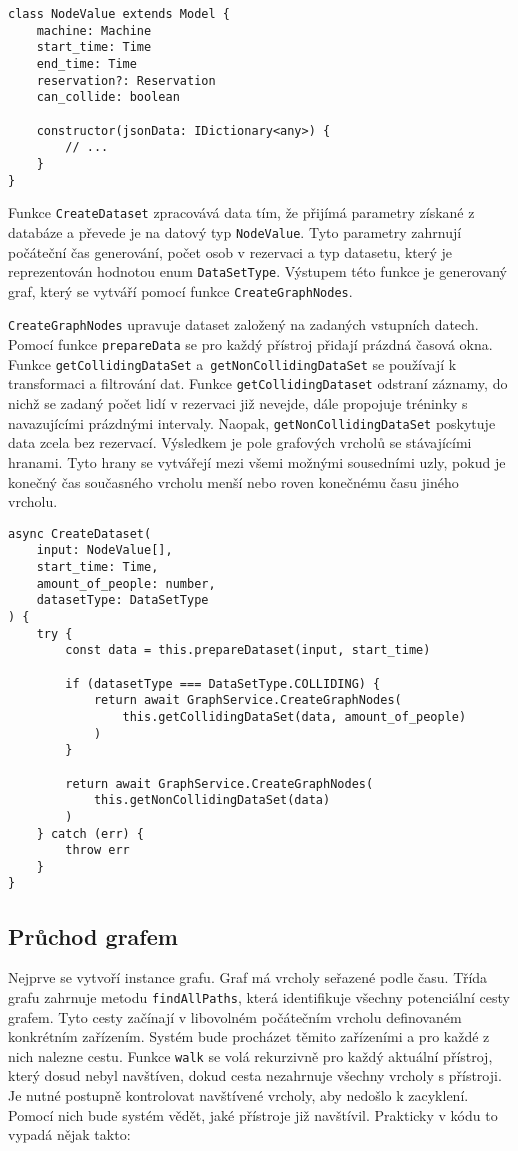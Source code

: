 \begin{lstlisting}
class NodeValue extends Model {
    machine: Machine
    start_time: Time
    end_time: Time
    reservation?: Reservation
    can_collide: boolean

    constructor(jsonData: IDictionary<any>) {
	    // ...
    }
}
\end{lstlisting}

Funkce \texttt{CreateDataset} zpracovává data tím, že přijímá parametry získané z databáze a převede je na datový typ \texttt{NodeValue}. Tyto parametry zahrnují počáteční čas generování, počet osob v rezervaci a typ datasetu, který je reprezentován hodnotou enum \texttt{DataSetType}. Výstupem této funkce je generovaný graf, který se vytváří pomocí funkce \texttt{CreateGraphNodes}.

\texttt{CreateGraphNodes} upravuje dataset založený na zadaných vstupních datech. Pomocí funkce \texttt{prepareData} se pro každý přístroj přidají prázdná časová okna. Funkce \texttt{getCollidingDataSet} a~\texttt{getNonCollidingDataSet} se používají k transformaci a filtrování dat. Funkce \texttt{getCollidingDataset} odstraní záznamy, do nichž se zadaný počet lidí v rezervaci již nevejde, dále propojuje tréninky s navazujícími prázdnými intervaly. Naopak, \texttt{getNonCollidingDataSet} poskytuje data zcela bez rezervací. Výsledkem je pole grafových vrcholů se stávajícími hranami. Tyto hrany se vytvářejí mezi všemi možnými sousedními uzly, pokud je konečný čas současného vrcholu menší nebo roven konečnému času jiného vrcholu.

\begin{lstlisting}
async CreateDataset(
    input: NodeValue[],
    start_time: Time,
    amount_of_people: number,
    datasetType: DataSetType
) {
    try {
	    const data = this.prepareDataset(input, start_time)

	    if (datasetType === DataSetType.COLLIDING) {
		    return await GraphService.CreateGraphNodes(
			    this.getCollidingDataSet(data, amount_of_people)
		    )
	    }

	    return await GraphService.CreateGraphNodes(
		    this.getNonCollidingDataSet(data)
	    )
    } catch (err) {
	    throw err
    }
}
\end{lstlisting}

\subsection{Průchod grafem}

Nejprve se vytvoří instance grafu. Graf má vrcholy seřazené podle času. Třída grafu zahrnuje metodu \texttt{findAllPaths}, která identifikuje všechny potenciální cesty grafem. Tyto cesty začínají v libovolném počátečním vrcholu definovaném konkrétním zařízením. Systém bude procházet těmito zařízeními a pro každé z nich nalezne cestu. Funkce \texttt{walk} se volá rekurzivně pro každý aktuální přístroj, který dosud nebyl navštíven, dokud cesta nezahrnuje všechny vrcholy s přístroji. Je nutné postupně kontrolovat navštívené vrcholy, aby nedošlo k zacyklení. Pomocí nich bude systém vědět, jaké přístroje již navštívil. Prakticky v kódu to vypadá nějak takto:


